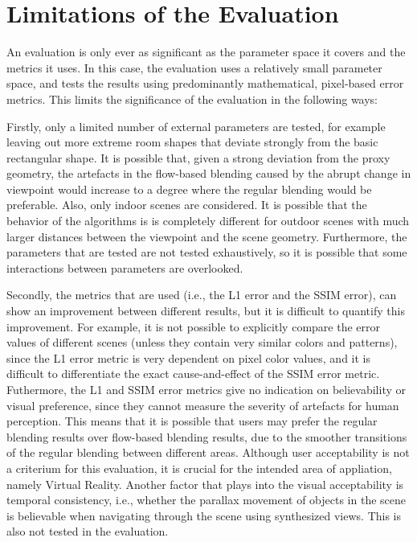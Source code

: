 
\section{Limitations of the Evaluation}\label{sec:limitations}
An evaluation is only ever as significant as the parameter space it covers and the metrics it uses. In this case, the evaluation uses a relatively small parameter space, and tests the results using predominantly mathematical, pixel-based error metrics. This limits the significance of the evaluation in the following ways:

Firstly, only a limited number of external parameters are tested, for example leaving out more extreme room shapes that deviate strongly from the basic rectangular shape. It is possible that, given a strong deviation from the proxy geometry, the artefacts in the flow-based blending caused by the abrupt change in viewpoint would increase to a degree where the regular blending would be preferable. Also, only indoor scenes are considered. It is possible that the behavior of the algorithms is is completely different for outdoor scenes with much larger distances between the viewpoint and the scene geometry. Furthermore, the parameters that are tested are not tested exhaustively, so it is possible that some interactions between parameters are overlooked.

Secondly, the metrics that are used (i.e., the L1 error and the SSIM error), can show an improvement between different results, but it is difficult to quantify this improvement. For example, it is not possible to explicitly compare the error values of different scenes (unless they contain very similar colors and patterns), since the L1 error metric is very dependent on pixel color values, and it is difficult to differentiate the exact cause-and-effect of the SSIM error metric. Futhermore, the L1 and SSIM error metrics give no indication on believability or visual preference, since they cannot measure the severity of artefacts for human perception. This means that it is possible that users may prefer the regular blending results over flow-based blending results, due to the smoother transitions of the regular blending between different areas. Although user acceptability is not a criterium for this evaluation, it is crucial for the intended area of appliation, namely Virtual Reality. Another factor that plays into the visual acceptability is temporal consistency, i.e., whether the parallax movement of objects in the scene is believable when navigating through the scene using synthesized views. This is also not tested in the evaluation.

